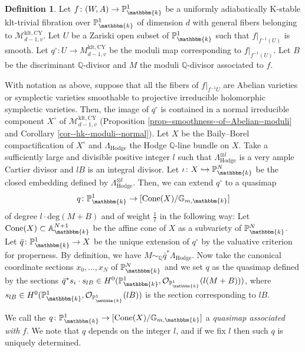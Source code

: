 \documentclass[12pt,twoside]{amsart}
\theoremstyle{definition}
\newtheorem{defn}[thm]{Definition}
\begin{document}
\begin{defn}\label{defn--associated--quasi--map--structure}
    Let $f\colon (W,A)\to\mathbb{P}_{\mathbbm{k}}^{1}$ be a uniformly adiabatically K-stable klt-trivial fibration over $\mathbb{P}_{\mathbbm{k}}^{1}$ of dimension $d$ with general fibers belonging to $\mathcal{M}_{d-1,v}^{\mathrm{klt},\mathrm{CY}}$.
    Let $U$ be a Zariski open subset of $\mathbb{P}_{\mathbbm{k}}^{1}$ such that $f|_{f^{-1}(U)}$ is smooth.
    Let $q^\circ\colon U\to M_{d-1,v}^{\mathrm{klt},\mathrm{CY}}$ be the moduli map corresponding to $f|_{f^{-1}(U)}$. 
    Let $B$ be the discriminant $\mathbb{Q}$-divisor and $M$ the moduli $\mathbb{Q}$-divisor associated to $f$.

    With notation as above, suppose that all the fibers of $f|_{f^{-1}U}$ are Abelian varieties or symplectic varieties smoothable to projective irreducible holomorphic symplectic varieties.
    Then, the image of $q^\circ$ is contained in a normal irreducible component $X^\circ$ of $\mathcal{M}_{d-1,v}^{\mathrm{klt},\mathrm{CY}}$ (Proposition \ref{prop--smoothness--of--Abelian--moduli} and Corollary \ref{cor--hk--moduli--normal}).
    Let $X$ be the Baily--Borel compactification of $X^\circ$ and $\Lambda_{\mathrm{Hodge}}$ the Hodge $\mathbb{Q}$-line bundle on $X$.
Take a sufficiently large and divisible positive integer $l$ such that $\Lambda_{\mathrm{Hodge}}^{\otimes l}$ is a very ample Cartier divisor and $lB$ is an integral divisor.    
Let $\iota\colon X\hookrightarrow \mathbb{P}_{\mathbbm{k}}^N$ be the closed embedding defined by $\Lambda_{\mathrm{Hodge}}^{\otimes l}$.
Then, we can extend $q^\circ$ to a quasimap 
$$q\colon \mathbb{P}_{\mathbbm{k}}^{1} \to [\mathrm{Cone}(X)/\mathbb{G}_{m, \mathbbm{k}}]$$
 of degree $l\cdot\mathrm{deg}(M+B)$ and of weight $\frac{1}{l}$ in the following way: 
Let $\mathrm{Cone}(X)\subset\mathbb{A}_{\mathbbm{k}}^{N+1}$ be the affine cone of $X$ as a subvariety of $\mathbb{P}_{\mathbbm{k}}^N$.
Let $\bar{q}\colon \mathbb{P}_{\mathbbm{k}}^1\to X$ be the unique extension of $q^{\circ}$ by the valuative criterion for properness.
By definition, we have $M\sim_{\mathbb{Q}}\bar{q}^*\Lambda_{\mathrm{Hodge}}$. 
Now take the canonical coordinate sections $x_0,\ldots,x_N$ of $\mathbb{P}^N_{\mathbbm{k}}$ and we set $q$ as the quasimap defined by the sections $\bar{q}^*s_i\cdot s_{lB}\in H^0(\mathbb{P}_{\mathbbm{k}}^{1},\mathcal{O}_{\mathbb{P}_{\mathbbm{k}}^{1}}(l(M+B)))$, where $s_{lB}\in H^0(\mathbb{P}_{\mathbbm{k}}^{1},\mathcal{O}_{\mathbb{P}_{\mathbbm{k}}^{1}}(lB))$ is the section corresponding to $lB$. 

We call the $q\colon \mathbb{P}_{\mathbbm{k}}^{1} \to [\mathrm{Cone}(X)/\mathbb{G}_{m, \mathbbm{k}}]$ a {\it quasimap associated with} $f$.
We note that $q$ depends on the integer $l$, and if we fix $l$ then such $q$ is uniquely determined.
\end{defn}
\end{document}
